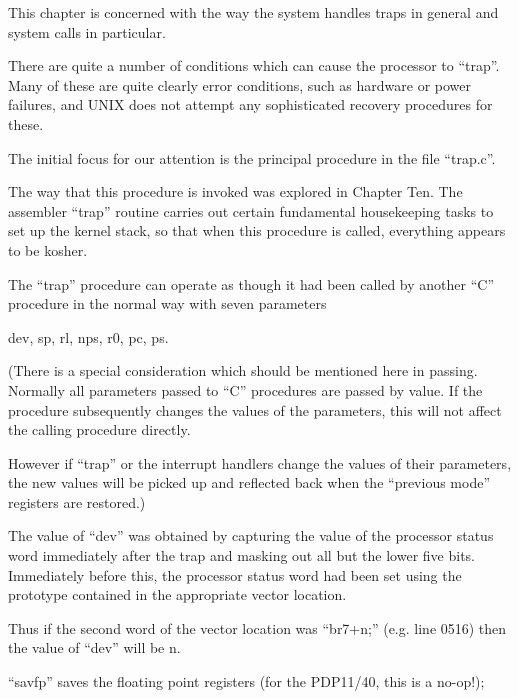 %
%

This chapter is concerned with the way
the system handles traps in general and
system calls in particular.

There are quite a number of conditions
which can cause the processor to
``trap''. Many of these are quite
clearly error conditions, such as
hardware or power failures, and UNIX
does not attempt any sophisticated
recovery procedures for these.

The initial focus for our attention is
the principal procedure in the file
``trap.c''.


The way that this procedure is invoked
was explored in Chapter Ten. The
assembler ``trap'' routine carries out
certain fundamental housekeeping tasks
to set up the kernel stack, so that
when this procedure is called, everything appears to be kosher.

The ``trap'' procedure can operate as
though it had been called by another
``C'' procedure in the normal way with
seven parameters

\begin{center}
 dev, sp, rl, nps, r0, pc, ps.
\end{center}

(There is a special consideration which
should be mentioned here in passing.
Normally all parameters passed to ``C''
procedures are passed by value. If the
procedure subsequently changes the
values of the parameters, this will not
affect the calling procedure directly.

However if ``trap'' or the interrupt
handlers change the values of their
parameters, the new values will be
picked up and reflected back when the
``previous mode'' registers are
restored.)

The value of ``dev'' was obtained by capturing the value of the processor
status word immediately after the trap
and masking out all but the lower five
bits. Immediately before this, the processor status word had been set using
the prototype contained in the
appropriate vector location.

Thus if the second word of the vector
location was ``br7+n;'' (e.g. line 0516)
then the value of ``dev'' will be n.

\bd
\item[2698:] ``savfp'' saves the floating point
 registers (for the PDP11/40, this
 is a no-op!);


